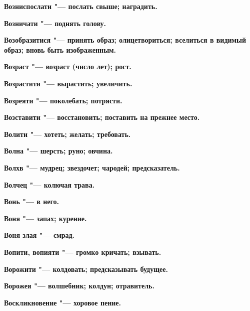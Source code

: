 \bfseries Возниспослати \normalfont{} "--- послать свыше; наградить. 




\bfseries Возничати \normalfont{} "--- поднять голову. 




\bfseries Возобразитися \normalfont{} "--- принять образ; олицетвориться; вселиться в видимый образ; вновь быть изображенным. 




\bfseries Возраст \normalfont{} "--- возраст (число лет); рост. 




\bfseries Возрастити \normalfont{} "--- вырастить; увеличить. 




\bfseries Возреяти \normalfont{} "--- поколебать; потрясти. 




\bfseries Возставити \normalfont{} "--- восстановить; поставить на прежнее место. 




\bfseries Волити \normalfont{} "--- хотеть; желать; требовать. 




\bfseries Волна \normalfont{} "--- шерсть; руно; овчина. 




\bfseries Волхв \normalfont{} "--- мудрец; звездочет; чародей; предсказатель. 




\bfseries Волчец \normalfont{} "--- колючая трава. 




\bfseries Вонь \normalfont{} "--- в него. 




\bfseries Воня \normalfont{} "--- запах; курение. 




\bfseries Воня злая \normalfont{} "--- смрад. 




\bfseries Вопити, вопияти \normalfont{} "--- громко кричать; взывать. 




\bfseries Ворожити \normalfont{} "--- колдовать; предсказывать будущее. 




\bfseries Ворожея \normalfont{} "--- волшебник; колдун; отравитель. 




\bfseries Воскликновение \normalfont{} "--- хоровое пение. 




